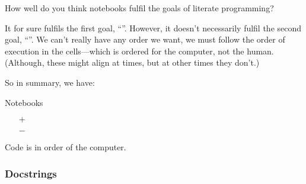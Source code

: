 \begin{frame}
%
\begin{activity}\label{NotebooksFullfilGoals}
How well do you think notebooks fulfil the goals of literate programming?
\end{activity}
\end{frame}

It for sure fulfils the first goal, \enquote{\LPexplain}.
However, it doesn't necessarily fulfil the second goal, \enquote{\LPorder}.
We can't really have any order we want, we must follow the order of execution 
in the cells---which is ordered for the computer, not the human.
(Although, these might align at times, but at other times they don't.)

So in summary, we have:

\begin{frame}
\begin{block}{Notebooks}
  \begin{itemize}
    \item[\(+\)] {\color{green!75!black}\LPexplain}
    \item[\(-\)] {\color{red}\LPorder}
  \end{itemize}
\end{block}

\begin{remark}
  Code is in order of the computer.
\end{remark}
\end{frame}

\subsubsection{Docstrings}

